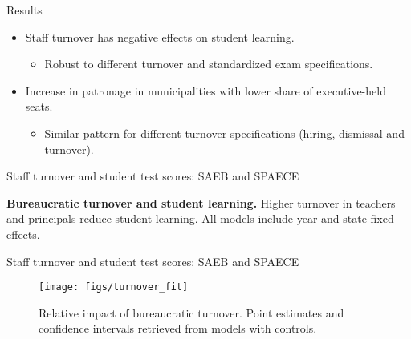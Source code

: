 \documentclass[ignorenonframetext,]{beamer}
\providecommand{\tightlist}{%
  \setlength{\itemsep}{0pt}\setlength{\parskip}{0pt}}
\begin{document}
\begin{frame}{Results}
\protect\hypertarget{results}{}

\begin{itemize}
\tightlist
\item
  Staff turnover has negative effects on student learning.

  \begin{itemize}
  \tightlist
  \item
    Robust to different turnover and standardized exam specifications.
  \end{itemize}
\item
  Increase in patronage in municipalities with lower share of
  executive-held seats.

  \begin{itemize}
  \tightlist
  \item
    Similar pattern for different turnover specifications (hiring,
    dismissal and turnover).
  \end{itemize}
\end{itemize}

\end{frame}

\begin{frame}{Staff turnover and student test scores: SAEB and SPAECE}
\protect\hypertarget{staff-turnover-and-student-test-scores-saeb-and-spaece}{}

\begin{table}[t]
  \centering
  \resizebox*{!}{\height}{%
  }
  \caption{\textbf{Bureaucratic turnover and student learning.} Higher turnover in teachers and principals reduce student learning. All models include year and state fixed effects.}
  \label{tbl:hlm_mods}
\end{table}

\end{frame}

\begin{frame}{Staff turnover and student test scores: SAEB and SPAECE}
\protect\hypertarget{staff-turnover-and-student-test-scores-saeb-and-spaece-1}{}

\begin{figure}

{\centering \texttt{[image: figs/turnover\_fit]} 

}

\caption{Relative impact of bureaucratic turnover. Point estimates and confidence intervals retrieved from models with controls.}\label{fig:unnamed-chunk-5}
\end{figure}

\end{frame}
\end{document}
